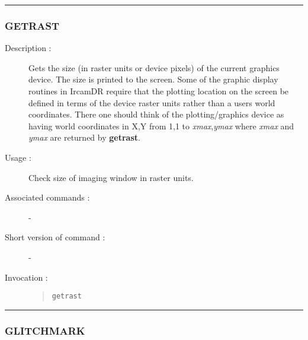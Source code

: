 \hrule 
\subsubsection*{\label{GETRAST}GETRAST}

\begin{description}

\item[Description :] Gets the size (in raster units or device pixels)
of the current graphics device. The size is printed to the screen.
Some of the graphic display routines in {\sc IrcamDR} require that the
plotting location on the screen be defined in terms of the device
raster units rather than a users world coordinates.  There one should
think of the plotting/graphics device as having world coordinates in
X,Y from 1,1 to {\it xmax},{\it ymax} where {\it xmax} and {\it ymax}
are returned by {\bf getrast}.

\item[Usage :] Check size of imaging window in raster units.
\item[Associated commands :] -
\item[Short version of command :] -
\item[Invocation :]

\begin{quote}{\tt  getrast }\end{quote}

\end{description}

\hrule 
\subsubsection*{\label{GLITCHMARK}GLITCHMARK}

